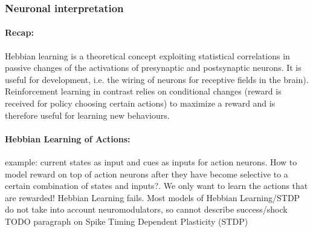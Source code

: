 \documentclass[11pt]{article}
\begin{document}
\subsubsection{Neuronal interpretation}
\paragraph{Recap:} Hebbian learning is a theoretical concept exploiting statistical correlations in passive changes of the activations of presynaptic and postsynaptic neurons. It is useful for development, i.e. the wiring of neurons for receptive fields in the brain). Reinforcement learning in contrast relies on conditional changes (reward is received for policy choosing certain actions) to maximize a reward and is therefore useful for learning new behaviours.

\paragraph{Hebbian Learning of Actions:}
example: current states as input and cues as inputs for action neurons. How to model reward on top of action neurons after they have become selective to a certain combination of states and inputs?. We only want to learn the actions that are rewarded! Hebbian Learning fails.
Most models of Hebbian Learning/STDP do not take into account neuromodulators, so cannot describe success/shock
\textsc{TODO} paragraph on Spike Timing Dependent Plasticity (STDP)
\end{document}
